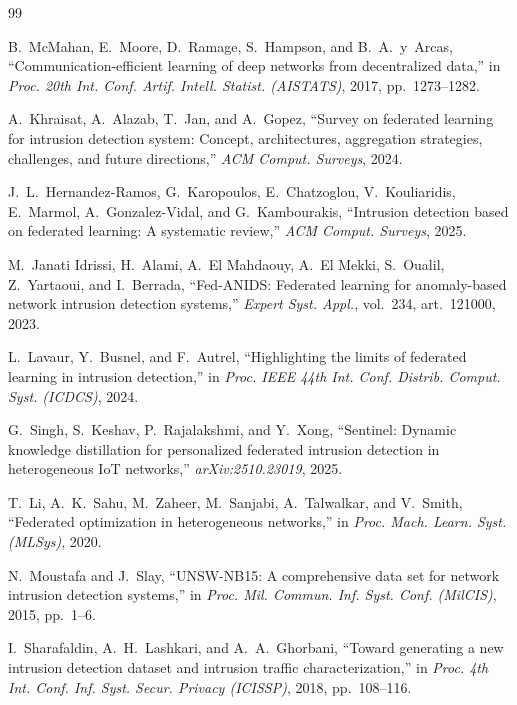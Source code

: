 \documentclass[11pt,a4paper]{article}
\begin{document}
\begin{thebibliography}{99}
\setlength{\itemsep}{2pt}

B.~McMahan, E.~Moore, D.~Ramage, S.~Hampson, and B.~A.~y~Arcas,
``Communication-efficient learning of deep networks from decentralized data,''
in \emph{Proc. 20th Int. Conf. Artif. Intell. Statist. (AISTATS)}, 2017,
pp.~1273--1282.

A.~Khraisat, A.~Alazab, T.~Jan, and A.~Gopez, ``Survey on federated learning for
intrusion detection system: Concept, architectures, aggregation strategies,
challenges, and future directions,'' \emph{ACM Comput. Surveys}, 2024.

J.~L.~Hernandez-Ramos, G.~Karopoulos, E.~Chatzoglou, V.~Kouliaridis, E.~Marmol,
A.~Gonzalez-Vidal, and G.~Kambourakis, ``Intrusion detection based on federated
learning: A systematic review,'' \emph{ACM Comput. Surveys}, 2025.

M.~Janati Idrissi, H.~Alami, A.~El Mahdaouy, A.~El Mekki, S.~Oualil, Z.~Yartaoui,
and I.~Berrada, ``Fed-ANIDS: Federated learning for anomaly-based network
intrusion detection systems,'' \emph{Expert Syst. Appl.}, vol.~234, art.~121000,
2023.

L.~Lavaur, Y.~Busnel, and F.~Autrel, ``Highlighting the limits of federated
learning in intrusion detection,'' in \emph{Proc. IEEE 44th Int. Conf. Distrib.
Comput. Syst. (ICDCS)}, 2024.

G.~Singh, S.~Keshav, P.~Rajalakshmi, and Y.~Xong, ``Sentinel: Dynamic knowledge
distillation for personalized federated intrusion detection in heterogeneous IoT
networks,'' \emph{arXiv:2510.23019}, 2025.

T.~Li, A.~K.~Sahu, M.~Zaheer, M.~Sanjabi, A.~Talwalkar, and V.~Smith, ``Federated
optimization in heterogeneous networks,'' in \emph{Proc. Mach. Learn. Syst.
(MLSys)}, 2020.

N.~Moustafa and J.~Slay, ``UNSW-NB15: A comprehensive data set for network
intrusion detection systems,'' in \emph{Proc. Mil. Commun. Inf. Syst. Conf.
(MilCIS)}, 2015, pp.~1--6.

I.~Sharafaldin, A.~H.~Lashkari, and A.~A.~Ghorbani, ``Toward generating a new
intrusion detection dataset and intrusion traffic characterization,'' in
\emph{Proc. 4th Int. Conf. Inf. Syst. Secur. Privacy (ICISSP)}, 2018,
pp.~108--116.


\end{thebibliography}
\end{document}
